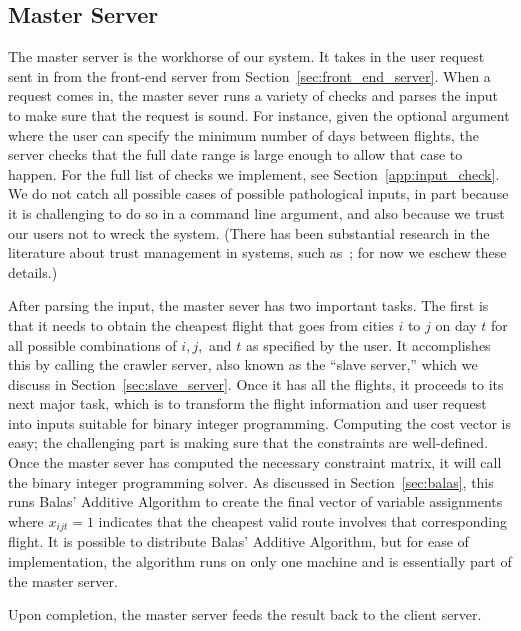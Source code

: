 \documentclass{article}
\begin{document}
\subsection{Master Server}\label{sec:master_server}

The master server is the workhorse of our system. It takes in the user request sent in from the front-end server from
Section~\ref{sec:front_end_server}. When a request comes in, the master sever runs a variety of checks and parses the input to make sure that the
request is sound. For instance, given the optional argument where the user can specify the minimum number of days between flights, the server checks
that the full date range is large enough to allow that case to happen. For the full list of checks we implement, see Section~\ref{app:input_check}. We
do not catch all possible cases of possible pathological inputs, in part because it is challenging to do so in a command line argument, and also
because we trust our users not to wreck the system. (There has been substantial research in the literature about trust management in systems, such
as~\cite{Blaze:2001:RTM:380171.380186}; for now we eschew these details.)

After parsing the input, the master sever has two important tasks. The first is that it needs to obtain the cheapest flight that goes from cities $i$
to $j$ on day $t$ for all possible combinations of $i, j,$ and $t$ as specified by the user. It accomplishes this by calling the crawler server, also
known as the ``slave server,'' which we discuss in Section~\ref{sec:slave_server}. Once it has all the flights, it proceeds to its next major task,
which is to transform the flight information and user request into inputs suitable for binary integer programming. Computing the cost vector is easy;
the challenging part is making sure that the constraints are well-defined. Once the master sever has computed the necessary constraint matrix, it will
call the binary integer programming solver.  As discussed in Section~\ref{sec:balas}, this runs Balas' Additive Algorithm to create the final vector
of variable assignments where $x_{ijt} = 1$ indicates that the cheapest valid route involves that corresponding flight. It is possible to distribute
Balas' Additive Algorithm, but for ease of implementation, the algorithm runs on only one machine and is essentially part of the master server.

Upon completion, the master server feeds the result back to the client server.
\end{document}
